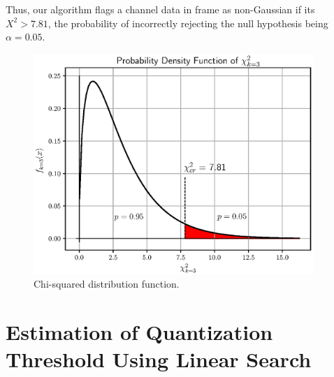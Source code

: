 \documentclass[letterpaper,twoside,12pt]{article}
\begin{document}
Thus, our algorithm flags a channel data in frame as non-Gaussian if its $X^2 > 7.81$, the probability of incorrectly rejecting the null hypothesis being $\alpha = 0.05$. 

\begin{figure}[h!]
  \begin{center}
  \includegraphics[width=25pc]{fig_chi2_pdf.eps}
  \caption{Chi-squared distribution function.}
  \label{chi2_pdf}
  \end{center}
\end{figure}



\section{Estimation of Quantization Threshold Using Linear Search}
\end{document}
